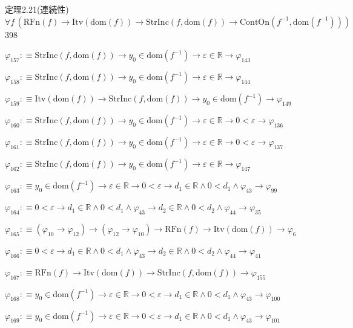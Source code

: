 \begin{fullproof}{定理2.21(連続性)}{$\forall f\,(\mathrm{RFn}(f) \to \mathrm{Itv}(\mathrm{dom}(f)) \to \mathrm{StrInc}(f,\mathrm{dom}(f)) \to \mathrm{ContOn}(f^{-1},\mathrm{dom}(f^{-1})))$}{398}
\begin{abbrevlist}
\item $\varphi_{157} :\equiv \mathrm{StrInc}(f,\mathrm{dom}(f)) \to y_{0} \in \mathrm{dom}(f^{-1}) \to \varepsilon \in \mathbb{R} \to \varphi_{143}$
\item $\varphi_{158} :\equiv \mathrm{StrInc}(f,\mathrm{dom}(f)) \to y_{0} \in \mathrm{dom}(f^{-1}) \to \varepsilon \in \mathbb{R} \to \varphi_{144}$
\item $\varphi_{159} :\equiv \mathrm{Itv}(\mathrm{dom}(f)) \to \mathrm{StrInc}(f,\mathrm{dom}(f)) \to y_{0} \in \mathrm{dom}(f^{-1}) \to \varphi_{149}$
\item $\varphi_{160} :\equiv \mathrm{StrInc}(f,\mathrm{dom}(f)) \to y_{0} \in \mathrm{dom}(f^{-1}) \to \varepsilon \in \mathbb{R} \to 0 < \varepsilon \to \varphi_{136}$
\item $\varphi_{161} :\equiv \mathrm{StrInc}(f,\mathrm{dom}(f)) \to y_{0} \in \mathrm{dom}(f^{-1}) \to \varepsilon \in \mathbb{R} \to 0 < \varepsilon \to \varphi_{137}$
\item $\varphi_{162} :\equiv \mathrm{StrInc}(f,\mathrm{dom}(f)) \to y_{0} \in \mathrm{dom}(f^{-1}) \to \varepsilon \in \mathbb{R} \to \varphi_{147}$
\item $\varphi_{163} :\equiv y_{0} \in \mathrm{dom}(f^{-1}) \to \varepsilon \in \mathbb{R} \to 0 < \varepsilon \to d_{1} \in \mathbb{R} \land 0 < d_{1} \land \varphi_{43} \to \varphi_{99}$
\item $\varphi_{164} :\equiv 0 < \varepsilon \to d_{1} \in \mathbb{R} \land 0 < d_{1} \land \varphi_{43} \to d_{2} \in \mathbb{R} \land 0 < d_{2} \land \varphi_{44} \to \varphi_{35}$
\item $\varphi_{165} :\equiv (\varphi_{10} \to \varphi_{12}) \to (\varphi_{12} \to \varphi_{10}) \to \mathrm{RFn}(f) \to \mathrm{Itv}(\mathrm{dom}(f)) \to \varphi_{6}$
\item $\varphi_{166} :\equiv 0 < \varepsilon \to d_{1} \in \mathbb{R} \land 0 < d_{1} \land \varphi_{43} \to d_{2} \in \mathbb{R} \land 0 < d_{2} \land \varphi_{44} \to \varphi_{41}$
\item $\varphi_{167} :\equiv \mathrm{RFn}(f) \to \mathrm{Itv}(\mathrm{dom}(f)) \to \mathrm{StrInc}(f,\mathrm{dom}(f)) \to \varphi_{155}$
\item $\varphi_{168} :\equiv y_{0} \in \mathrm{dom}(f^{-1}) \to \varepsilon \in \mathbb{R} \to 0 < \varepsilon \to d_{1} \in \mathbb{R} \land 0 < d_{1} \land \varphi_{43} \to \varphi_{100}$
\item $\varphi_{169} :\equiv y_{0} \in \mathrm{dom}(f^{-1}) \to \varepsilon \in \mathbb{R} \to 0 < \varepsilon \to d_{1} \in \mathbb{R} \land 0 < d_{1} \land \varphi_{43} \to \varphi_{101}$

\end{abbrevlist}
\end{fullproof}
